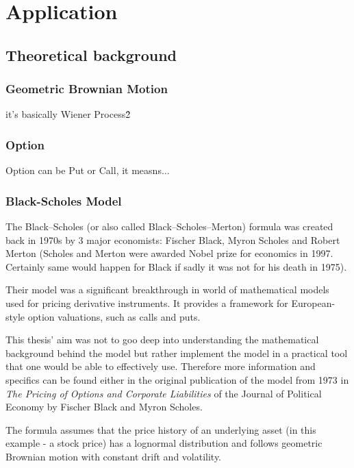 \chapter{Application}
\section{Theoretical background}

\subsection{Geometric Brownian Motion}
\todo
it's basically Wiener Process\^2

\subsection{Option}
\todo
Option can be Put or Call, it measns...

\subsection{Black-Scholes Model}
The Black--Scholes (or also called Black--Scholes--Merton) formula was created back in 1970s by 3 major economists: Fischer Black, Myron Scholes and Robert Merton (Scholes and Merton were awarded Nobel prize for economics in 1997. Certainly same would happen for Black if sadly it was not for his death in 1975).

Their model was a significant breakthrough in world of mathematical models used for pricing derivative instruments. It provides a framework for European-style option valuations, such as calls and puts.

This thesis' aim was not to goo deep into understanding the mathematical background behind the model but rather implement the model in a practical tool that one would be able to effectively use. Therefore more information and specifics can be found either in the original publication \cite{10.2307/1831029} of the model from 1973 in \textit{The Pricing of Options and Corporate Liabilities} of the Journal of Political Economy by Fischer Black and Myron Scholes.

The formula assumes that the price history of an underlying asset (in this example - a stock price) has a lognormal distribution and follows geometric Brownian motion with constant drift and volatility. 

